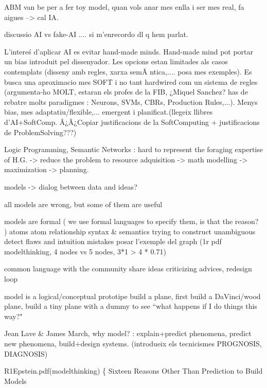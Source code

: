 \documentclass{report}
\begin{document}




ABM van be per a fer toy model, quan vols anar mes enlla i ser mes real, fa aigues --> cal IA.

discussio AI vs fake-AI .... si m'enrecordo dl q hem parlat.

L'intere\'s d'aplicar AI es evitar hand-made minds. Hand-made mind pot portar un bias introduit pel dissenyador.
Les opcions estan limitades als casos contemplats (disseny amb regles, xarxa semÃ ntica,.... posa mes exemples).
Es busca una aproximacio mes SOFT i no tant hardwired com un sistema de regles (argumenta-ho MOLT,
estaran els profes de la FIB, ¿Miquel Sanchez? has de rebatre molts paradigmes : Neurons, SVMs, CBRs, Production Rules,...). 
Menys bias, mes adaptatiu/flexible,... emergent i planificat.(llegeix llibres d'AI+SoftComp. Â¿Â¿Copiar justificacions de la SoftComputing + justificacions de ProblemSolving???)

Logic Programming, Semantic Networks : hard to represent the foraging expertise of H.G. -> reduce the problem to 
resource adquisition -> math modelling -> maximization -> planning.

models -> dialog between data and ideas?

all models are wrong, but some of them are useful

models are formal ( we use formal languages to specify them, is that the reason? )
	atoms
	atom relationship
	syntax \& semantics
		trying to construct unambiguous 
	detect flaws and intuition mistakes
		posar l'exemple del graph (1r pdf modelthinking, 4 nodes vs 5 nodes, 3*1 > 4 * 0.71)
	
	common language with the community
			share ideas
			criticizing
			advices, redesign loop

	model is a logical/conceptual prototipe
		build a plane, first build a DaVinci/wood plane, build a tiny plane with a dummy
		to see ``what happens if I do things this way?"
	
Jean Lave \& James March, why model? : explain+predict phenomena, predict new phenomena, build+design systems.
(introdueix els tecnicismes PROGNOSIS, DIAGNOSIS)

R1Epstein.pdf(modelthinking)
\{
Sixteen Reasons Other Than Prediction to Build Models\\
\end{document}
